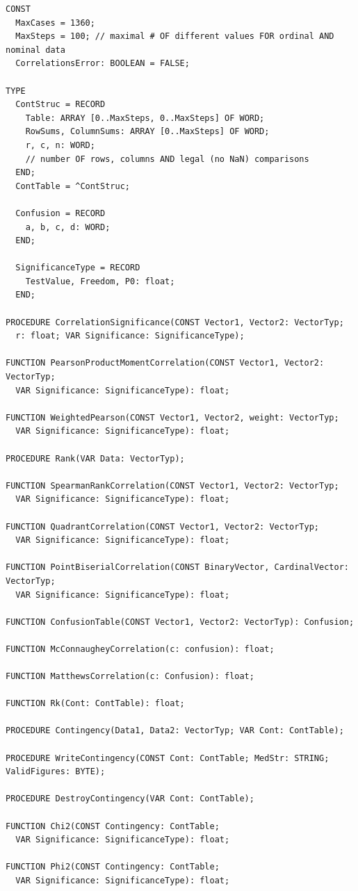 \begin{refsection}
\begin{lstlisting}[caption=Interface for unit Correlations]
CONST
  MaxCases = 1360;
  MaxSteps = 100; // maximal # OF different values FOR ordinal AND nominal data
  CorrelationsError: BOOLEAN = FALSE;

TYPE
  ContStruc = RECORD
    Table: ARRAY [0..MaxSteps, 0..MaxSteps] OF WORD;
    RowSums, ColumnSums: ARRAY [0..MaxSteps] OF WORD;
    r, c, n: WORD;
    // number OF rows, columns AND legal (no NaN) comparisons
  END;
  ContTable = ^ContStruc;

  Confusion = RECORD
    a, b, c, d: WORD;
  END;

  SignificanceType = RECORD
    TestValue, Freedom, P0: float;
  END;

PROCEDURE CorrelationSignificance(CONST Vector1, Vector2: VectorTyp;
  r: float; VAR Significance: SignificanceType);

FUNCTION PearsonProductMomentCorrelation(CONST Vector1, Vector2: VectorTyp;
  VAR Significance: SignificanceType): float;

FUNCTION WeightedPearson(CONST Vector1, Vector2, weight: VectorTyp;
  VAR Significance: SignificanceType): float;

PROCEDURE Rank(VAR Data: VectorTyp);

FUNCTION SpearmanRankCorrelation(CONST Vector1, Vector2: VectorTyp;
  VAR Significance: SignificanceType): float;

FUNCTION QuadrantCorrelation(CONST Vector1, Vector2: VectorTyp;
  VAR Significance: SignificanceType): float;

FUNCTION PointBiserialCorrelation(CONST BinaryVector, CardinalVector: VectorTyp;
  VAR Significance: SignificanceType): float;

FUNCTION ConfusionTable(CONST Vector1, Vector2: VectorTyp): Confusion;

FUNCTION McConnaugheyCorrelation(c: confusion): float;

FUNCTION MatthewsCorrelation(c: Confusion): float;

FUNCTION Rk(Cont: ContTable): float;

PROCEDURE Contingency(Data1, Data2: VectorTyp; VAR Cont: ContTable);

PROCEDURE WriteContingency(CONST Cont: ContTable; MedStr: STRING; ValidFigures: BYTE);

PROCEDURE DestroyContingency(VAR Cont: ContTable);

FUNCTION Chi2(CONST Contingency: ContTable;
  VAR Significance: SignificanceType): float;

FUNCTION Phi2(CONST Contingency: ContTable;
  VAR Significance: SignificanceType): float;


\end{lstlisting}
\end{refsection}
